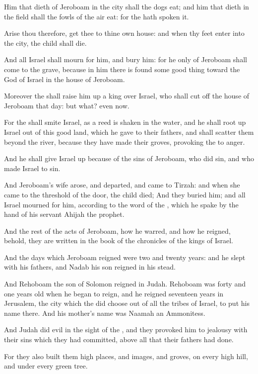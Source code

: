 \verse Him that dieth of Jeroboam in the city shall the dogs eat; and him that dieth in the field shall the fowls of the air eat: for the \LORD hath spoken it.

\verse Arise thou therefore, get thee to thine own house: and when thy feet enter into the city, the child shall die.

\verse And all Israel shall mourn for him, and bury him: for he only of Jeroboam shall come to the grave, because in him there is found some good thing toward the \LORD God of Israel in the house of Jeroboam.

\verse Moreover the \LORD shall raise him up a king over Israel, who shall cut off the house of Jeroboam that day: but what? even now.

\verse For the \LORD shall smite Israel, as a reed is shaken in the water, and he shall root up Israel out of this good land, which he gave to their fathers, and shall scatter them beyond the river, because they have made their groves, provoking the \LORD to anger.

\verse And he shall give Israel up because of the sins of Jeroboam, who did sin, and who made Israel to sin.

\verse And Jeroboam's wife arose, and departed, and came to Tirzah: and when she came to the threshold of the door, the child died; \verse And they buried him; and all Israel mourned for him, according to the word of the \LORD, which he spake by the hand of his servant Ahijah the prophet.

\verse And the rest of the acts of Jeroboam, how he warred, and how he reigned, behold, they are written in the book of the chronicles of the kings of Israel.

\verse And the days which Jeroboam reigned were two and twenty years: and he slept with his fathers, and Nadab his son reigned in his stead.

\verse And Rehoboam the son of Solomon reigned in Judah. Rehoboam was forty and one years old when he began to reign, and he reigned seventeen years in Jerusalem, the city which the \LORD did choose out of all the tribes of Israel, to put his name there. And his mother's name was Naamah an Ammonitess.

\verse And Judah did evil in the sight of the \LORD, and they provoked him to jealousy with their sins which they had committed, above all that their fathers had done.

\verse For they also built them high places, and images, and groves, on every high hill, and under every green tree.

